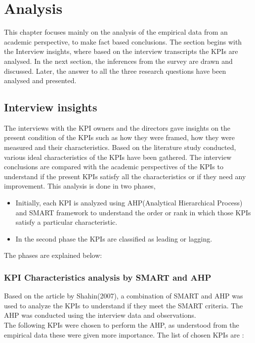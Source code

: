 \chapter{Analysis}
This chapter focuses mainly on the analysis of the empirical data from an academic perspective, to make fact based conclusions. The section begins with the Interview insights, where based on the interview transcripts the KPIs are analysed. In the next section, the inferences from the survey are drawn and discussed. Later, the answer to all the three research questions have been analysed and presented.
 
\section{ Interview insights }
The interviews with the KPI owners and the directors gave insights on the present condition of the KPIs such as how they were framed, how they were measured and their characteristics. Based on the literature study conducted, various ideal characteristics of the KPIs have been gathered. The interview conclusions are compared with the academic perspectives of the KPIs to understand if the present KPIs satisfy all the characteristics or if they need any improvement. 
This analysis is done in two phases,\\ 
\begin{itemize}
    \item Initially, each KPI is analyzed using AHP(Analytical Hierarchical Process) and SMART framework to understand the order or rank in which those KPIs satisfy a particular characteristic.\\  
    \item In the second phase the KPIs are classified as leading or lagging.\\   
\end{itemize}
 The phases are explained below:

\subsection{KPI Characteristics analysis by SMART and AHP}
Based on the article by Shahin(2007), a combination of SMART and AHP was used to analyze the KPIs to understand if they meet the SMART criteria. The AHP was conducted using the interview data and observations. \\
The following KPIs were chosen to perform the AHP, as understood from the empirical data these were given more importance. The list of chosen KPIs are : \\

